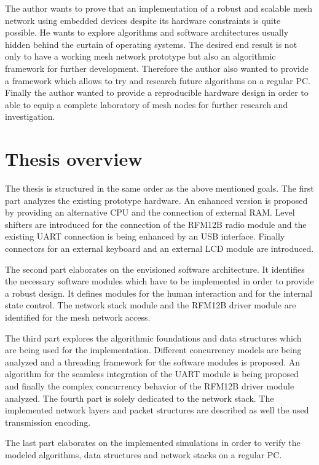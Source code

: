 The author wants to prove that an implementation of a robust and scalable mesh network using embedded devices despite its hardware constraints is quite possible. He wants to explore algorithms and software architectures usually hidden behind the curtain of operating systems.
The desired end result is not only to have a working mesh network prototype but also an algorithmic framework for further development. Therefore the author also wanted to provide a framework which allows to try and research future algorithms on a regular PC.
Finally the author wanted to provide a reproducible hardware design in order to able to equip a complete laboratory of mesh nodes for further research and investigation.

\section{Thesis overview}%
The thesis is structured in the same order as the above mentioned goals. The first part analyzes the existing prototype hardware. An enhanced version is proposed by providing an alternative CPU and the connection of external RAM. Level shifters are introduced for the connection of the RFM12B radio module and the existing UART connection is being enhanced by an USB interface. Finally connectors for an external keyboard and an external LCD module are introduced.

The second part elaborates on the envisioned software architecture. It identifies the necessary software modules which have to be implemented in order to provide a robust design. It defines modules for the human interaction and for the internal state control. The network stack module and the RFM12B driver module are identified for the mesh network access.

The third part explores the algorithmic foundations and data structures which are being used for the implementation. Different concurrency models are being analyzed and a threading framework for the software modules is proposed. An algorithm for the seamless integration of the UART module is being proposed and finally the complex concurrency behavior of the RFM12B driver module analyzed.
The fourth part is solely dedicated to the network stack. The implemented network layers and packet structures are described as well the used transmission encoding.

The last part elaborates on the implemented simulations in order to verify the modeled algorithms, data structures and network stacks on a regular PC.

